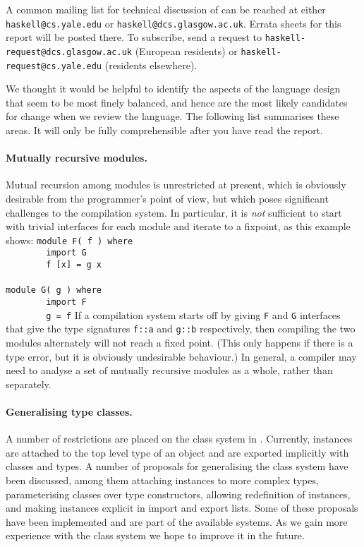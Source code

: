 A common mailing list for technical discussion of \Haskell{} can be
reached at either \mbox{\tt haskell@cs.yale.edu} or \mbox{\tt haskell@dcs.glasgow.ac.uk}.
\label{haskell-mailing-list}
Errata sheets for this report will be posted there.
To subscribe, send a request to 
\mbox{\tt haskell-request@dcs.glasgow.ac.uk} (European residents) or
\mbox{\tt haskell-request@cs.yale.edu} (residents elsewhere).

We thought it would be helpful to identify the aspects of the language
design that seem to be most finely balanced, and hence are the
most likely candidates for change when we review the language.
The following list summarises these areas.  It will only be fully
comprehensible after you have read the report.

\paragraph*{Mutually recursive modules.}
Mutual recursion among modules is unrestricted at pre\-sent, which is
obviously desirable from the programmer's point of view, but which poses
significant challenges to the compilation system.  In particular, it is
{\em not} sufficient to start with trivial interfaces for each module and
iterate to a fixpoint, as this example shows:
\bprog
\mbox{\tt module\ F(\ f\ )\ where}\\
\mbox{\tt \ \ \ \ \ \ \ \ import\ G}\\
\mbox{\tt \ \ \ \ \ \ \ \ f\ [x]\ =\ g\ x}\\
\mbox{\tt }\\[-8pt]
\mbox{\tt module\ G(\ g\ )\ where}\\
\mbox{\tt \ \ \ \ \ \ \ \ import\ F}\\
\mbox{\tt \ \ \ \ \ \ \ \ g\ =\ f}
\eprog
If a compilation system starts off by giving \mbox{\tt F} and \mbox{\tt G} interfaces
that give the type signatures \mbox{\tt f::a} and \mbox{\tt g::b} respectively, then
compiling the two modules alternately will not reach a fixed point.
(This only happens if there is a type error, but it is obviously
undesirable behaviour.)  In general, a compiler may need to analyse a
set of mutually recursive modules as a whole, rather than separately.

\paragraph*{Generalising type classes.}  A number of restrictions are
placed on the class system in \Haskell{}.  Currently, instances
are attached to the top level type of an object and are exported
implicitly with classes and types.  A number of proposals for
generalising the class system have been discussed, among them attaching
instances to more complex types, parameterising classes over type
constructors, allowing redefinition of instances, and making instances
explicit in import and export lists.  Some of these proposals have
been implemented and are part of the available \Haskell{} systems.  As
we gain more experience with the class system we hope to improve it
in the future.


